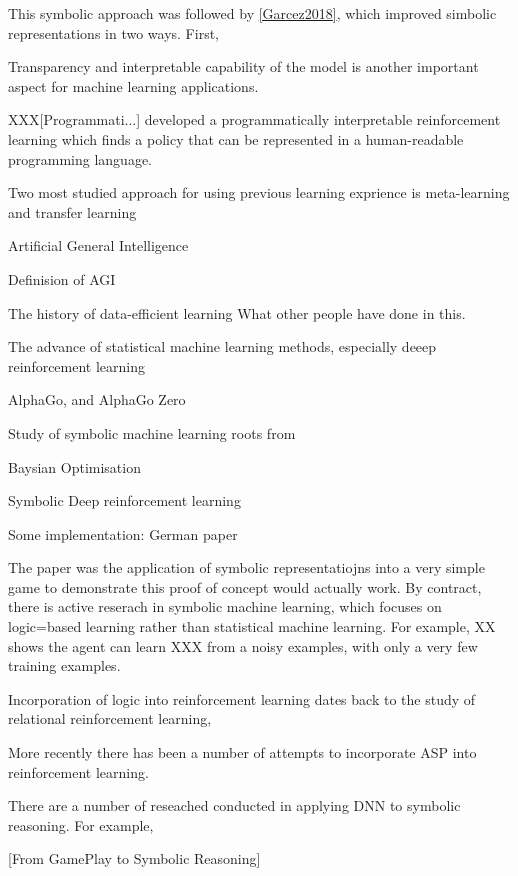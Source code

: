 \documentclass[12pt,twoside]{report}
\begin{document}
This symbolic approach was followed by \ref{Garcez2018}, which improved simbolic representations in two ways. First,



Transparency and interpretable capability of the model is another important aspect for machine learning applications.

XXX[Programmati...] developed a programmatically interpretable reinforcement learning which finds a policy that can be represented in a human-readable programming language.

Two most studied approach for using previous learning exprience is meta-learning and transfer learning

Artificial General Intelligence

Definision of AGI

The history of data-efficient learning
What other people have done in this.

The advance of statistical machine learning methods, especially deeep reinforcement learning

AlphaGo, and AlphaGo Zero

Study of symbolic machine learning roots from

Baysian Optimisation

Symbolic Deep reinforcement learning

Some implementation: German paper

The paper was the application of symbolic representatiojns into a very simple game to demonstrate this proof of concept would actually work.
By contract, there is active reserach in symbolic machine learning, which focuses on logic=based learning rather than statistical machine learning.
For example, XX shows the agent can learn XXX from a noisy examples, with only a very few training examples.


Incorporation of logic into reinforcement learning dates back to the study of relational reinforcement learning,


More recently there has been a number of attempts to incorporate ASP into reinforcement learning.

There are a number of reseached conducted in applying DNN to symbolic reasoning.
For example,

[From GamePlay to Symbolic Reasoning]
\end{document}

